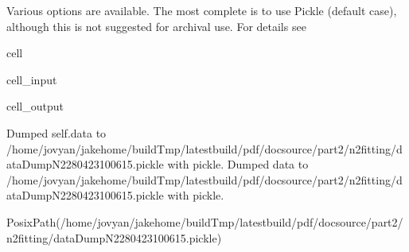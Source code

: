 \documentclass[letterpaper,table,10pt,english]{jupyterBook}
\begin{document}
\sphinxAtStartPar
Various options are available. The most complete is to use Pickle (default case), although this is not suggested for archival use. For details see 

\begin{sphinxuseclass}{cell}\begin{sphinxVerbatimInput}

\begin{sphinxuseclass}{cell_input}
\begin{sphinxVerbatim}[commandchars=\\\{\}]
    

     
\end{sphinxVerbatim}

\end{sphinxuseclass}\end{sphinxVerbatimInput}
\begin{sphinxVerbatimOutput}

\begin{sphinxuseclass}{cell_output}
\begin{sphinxVerbatim}[commandchars=\\\{\}]
Dumped self.data to /home/jovyan/jake\PYGZhy{}home/buildTmp/\PYGZus{}latest\PYGZus{}build/pdf/doc\PYGZhy{}source/part2/n2fitting/dataDump\PYGZus{}N2\PYGZus{}280423\PYGZus{}10\PYGZhy{}06\PYGZhy{}15.pickle with pickle.
Dumped data to /home/jovyan/jake\PYGZhy{}home/buildTmp/\PYGZus{}latest\PYGZus{}build/pdf/doc\PYGZhy{}source/part2/n2fitting/dataDump\PYGZus{}N2\PYGZus{}280423\PYGZus{}10\PYGZhy{}06\PYGZhy{}15.pickle with pickle.
\end{sphinxVerbatim}

\begin{sphinxVerbatim}[commandchars=\\\{\}]
PosixPath(\PYGZsq{}/home/jovyan/jake\PYGZhy{}home/buildTmp/\PYGZus{}latest\PYGZus{}build/pdf/doc\PYGZhy{}source/part2/n2fitting/dataDump\PYGZus{}N2\PYGZus{}280423\PYGZus{}10\PYGZhy{}06\PYGZhy{}15.pickle\PYGZsq{})
\end{sphinxVerbatim}

\end{sphinxuseclass}\end{sphinxVerbatimOutput}

\end{sphinxuseclass}
\end{document}
